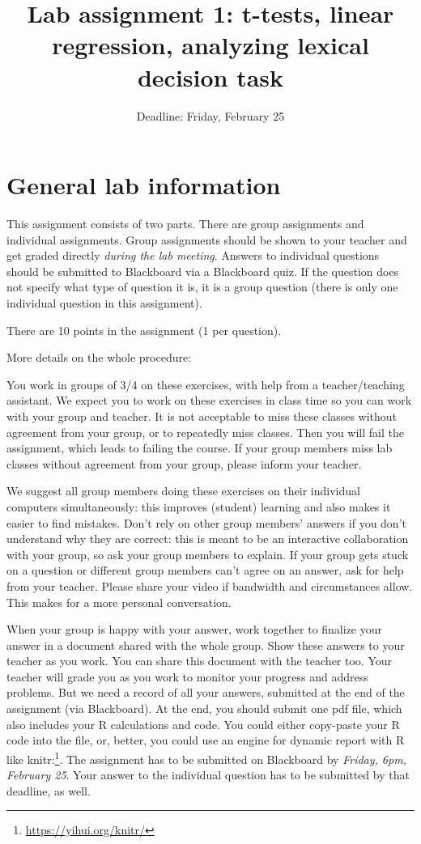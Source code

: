 \documentclass{article}\usepackage[]{graphicx}\usepackage[]{color}
\title{Lab assignment 1: t-tests, linear regression, analyzing lexical decision task}
\author{}
\date{Deadline: Friday, February 25}
\newcommand{\link}[1]{\footnote{\color{blue}\href{#1}{#1}}}
\begin{document}

\maketitle

\section{General lab information}

This assignment consists of two parts. There are group assignments and individual assignments. Group assignments should be shown to your teacher and get graded directly \emph{during the lab meeting}. Answers to individual questions should be submitted to Blackboard via a Blackboard quiz. If the question does not specify what type of question it is, it is a group question (there is only one individual question in this assignment).

There are 10 points in the assignment (1 per question).

More details on the whole procedure:

You work in groups of 3/4 on these exercises, with help from a teacher/teaching assistant. We expect you to work on these exercises in class time so you can work with your group and teacher. It is not acceptable to miss these classes without agreement from your group, or to repeatedly miss classes. Then you will fail the assignment, which leads to failing the course. If your group members miss lab classes without agreement from your group, please inform your teacher.

We suggest all group members doing these exercises on their individual computers simultaneously: this improves (student) learning and also makes it easier to find mistakes. Don't rely on other group members' answers if you don't understand why they are correct: this is meant to be an interactive collaboration with your group, so ask your group members to explain. If your group gets stuck on a question or different group members can't agree on an answer, ask for help from your teacher. Please share your video if bandwidth and circumstances allow. This makes for a more personal conversation.

When your group is happy with your answer, work together to finalize your answer in a document shared with the whole group. Show these answers to your teacher as you work. You can share this document with the teacher too. Your teacher will grade you as you work to monitor your progress and address problems. But we need a record of all your answers, submitted at the end of the assignment (via Blackboard). At the end, you should submit one pdf file, which also includes your R calculations and code. You could either copy-paste your R code into the file, or, better, you could use an engine for dynamic report with R like knitr:\link{https://yihui.org/knitr/}. The assignment has to be submitted on Blackboard by \emph{Friday, 6pm, February 25}. Your answer to the individual question has to be submitted by that deadline, as well.
\end{document}
